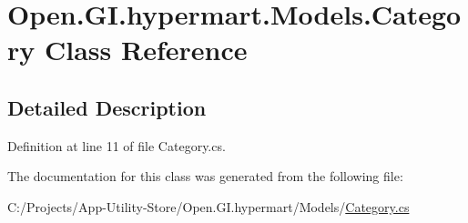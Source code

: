\hypertarget{class_open_1_1_g_i_1_1hypermart_1_1_models_1_1_category}{}\section{Open.\+G\+I.\+hypermart.\+Models.\+Category Class Reference}
\label{class_open_1_1_g_i_1_1hypermart_1_1_models_1_1_category}


 




\subsection{Detailed Description}




Definition at line 11 of file Category.\+cs.



The documentation for this class was generated from the following file\+:\begin{DoxyCompactItemize}
\item 
C\+:/\+Projects/\+App-\/\+Utility-\/\+Store/\+Open.\+G\+I.\+hypermart/\+Models/\hyperlink{_category_8cs}{Category.\+cs}\end{DoxyCompactItemize}
